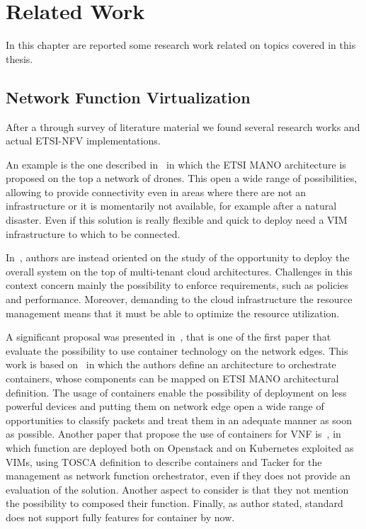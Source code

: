 \chapter{Related Work}
\label{chap:rel_wk}

In this chapter are reported some research work related on topics covered in
this thesis. 

\section{Network Function Virtualization}
After a through survey of literature material we found several research works
and actual ETSI-NFV implementations.

An example is the one described in~\cite{nogales2018nfv} in
which the ETSI MANO architecture is proposed on the top a network of drones.
This open a wide range of possibilities, allowing to provide connectivity even
in areas where there are not an infrastructure or it is momentarily not
available, for example after a natural disaster. Even if this solution is really
flexible and quick to deploy need a VIM infrastructure to which to be connected.

In~\cite{yu2015network}, authors are instead oriented on the study of the
opportunity to deploy the overall system on the top of multi-tenant cloud
architectures. Challenges in this context concern mainly the possibility to
enforce requirements, such as policies and performance. Moreover, demanding to
the cloud infrastructure the resource management means that it must be able to
optimize the resource utilization.

A significant proposal was presented in~\cite{cziva2017container}, that is one
of the first paper that evaluate the possibility to use container technology on
the network edges. This work is based on~\cite{cziva2015container} in which the
authors define an architecture to orchestrate containers, whose components can
be mapped on ETSI MANO architectural definition. The usage of containers enable
the possibility of deployment on less powerful devices and putting them on
network edge open a wide range of opportunities to classify packets and treat
them in an adequate manner as soon as possible. Another paper that propose the
use of containers for VNF is~\cite{hoang2018extended}, in which function are
deployed both on Openstack and on Kubernetes exploited as VIMs, using TOSCA
definition to describe containers and Tacker for the management as network
function orchestrator, even if they does not provide an evaluation of the
solution. Another aspect to consider is that they not mention the possibility to
composed their function. Finally, as author stated, standard does not support
fully features for container by now.


